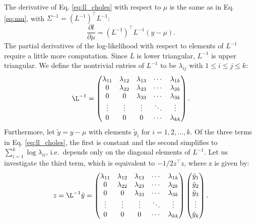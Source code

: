\documentclass{article}
\begin{document}
The derivative of Eq. \ref{eq:ll_choles} with respect to $\mu$ is the same 
as in Eq. \ref{eq:mu}, with $\Sigma^{-1} =  (L^{-1})^\top L^{-1}$:
%
\begin{equation}
 \frac{\partial l}{\partial \mu} = (L^{-1})^\top L^{-1} (y-\mu).
 \label{eq:mu_chol}
\end{equation}
%
The partial derivatives of the log-likelihood with respect to elements of 
$L^{-1}$ require a little more computation. Since $L$ is lower triangular, 
$L^{-1}$ is upper triangular. We define the nontrivial entries of $L^{-1}$ 
to be $\lambda_{ij}$ with $1 \leq i \leq j \leq k$: 
%
\begin{equation}
  \L^{-1}=
  \begin{pmatrix}
    \lambda_{11} & \lambda_{12} & \lambda_{13} & \cdots & \lambda_{1k} \\
    0 & \lambda_{22} & \lambda_{23} & \cdots & \lambda_{2k} \\
    0 & 0 & \lambda_{33} & \cdots & \lambda_{3k} \\
    \vdots & \vdots & \vdots & \ddots & \vdots \\
    0 & 0 & 0 & \cdots & \lambda_{kk}
  \end{pmatrix}.
\end{equation}
%
Furthermore, let $\tilde{y} = y - \mu$ with elements $\tilde{y}_i$ for 
$i = 1, 2, \dots, k$. 
Of the three terms in Eq. \ref{eq:ll_choles}, the first is constant and the 
second simplifies to $\sum_{i=1}^k \log{\lambda_{ii}}$, i.e.\ depends only 
on the diagonal elements of $L^{-1}$. Let us investigate the third term, which 
is equivalent to $-1/2 z^\top z$, where z is given by:
%
\begin{equation}
	z = \L^{-1} \tilde{y}=
  \begin{pmatrix}
    \lambda_{11} & \lambda_{12} & \lambda_{13} & \cdots & \lambda_{1k} \\
    0 & \lambda_{22} & \lambda_{23} & \cdots & \lambda_{2k} \\
    0 & 0 & \lambda_{33} & \cdots & \lambda_{3k} \\
    \vdots & \vdots & \vdots & \ddots & \vdots \\
    0 & 0 & 0 & \cdots & \lambda_{kk}
  \end{pmatrix}
  \begin{pmatrix}
    \tilde{y}_1 \\
    \tilde{y}_2 \\
    \tilde{y}_3	\\
    \vdots \\
    \tilde{y}_k
  \end{pmatrix}.
\end{equation}
\end{document}
